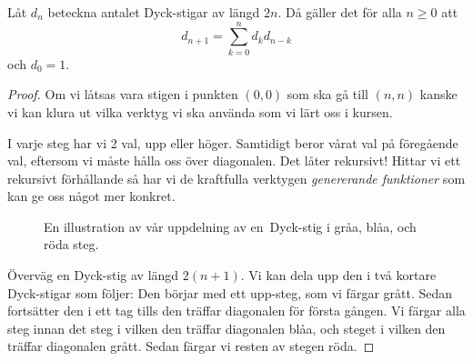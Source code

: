 \documentclass{tufte-handout}
\begin{document}
\begin{lemma}\label{dyck_path_recursion_lemma}
    Låt $d_n$ beteckna antalet Dyck-stigar av längd $2n$. Då gäller det för alla $n \geq 0$ att
    $$d_{n+1} = \sum_{k=0}^{n} d_k d_{n-k}$$
    och $d_0 = 1$.

    \begin{proof}
     Om vi låtsas vara stigen i punkten $(0,0)$ som ska gå till $(n,n)$ kanske vi kan klura ut vilka verktyg vi ska använda som vi lärt oss i kursen.\par
     \noindent I varje steg har vi 2 val, upp eller höger. Samtidigt beror vårat val på föregående val, eftersom vi måste hålla oss över diagonalen. Det låter rekursivt! Hittar vi ett rekursivt förhållande så har vi de kraftfulla verktygen \emph{genererande funktioner} som kan ge oss något mer konkret.\clearpage
     \begin{figure}[hbt!]
          \centering
          \caption{En illustration av vår uppdelning av en\, Dyck-stig i gråa, blåa, och röda steg.}
      \end{figure}
        Överväg en Dyck-stig av längd $2(n+1)$. Vi kan dela upp den i två kortare Dyck-stigar som följer: Den börjar med ett upp-steg, som vi färgar grått. Sedan fortsätter den i ett tag tills den träffar diagonalen för första gången. Vi färgar alla steg innan det steg i vilken den träffar diagonalen blåa, och steget i vilken den träffar diagonalen grått. Sedan färgar vi resten av stegen röda.


\end{proof}
\end{lemma}
\end{document}
